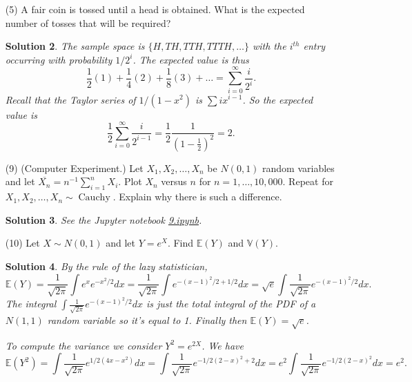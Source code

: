 \documentclass[10pt]{article}
\newtheorem*{sol}{Solution}
\newcommand{\V}{\mathbb{V}}
\newcommand{\E}{\mathbb{E}}
\begin{document}
\begin{enumerate}
\begin{sol}
By independence, the variance is $\V(X_n) = \sum_{i=0}^n \V(1-2Y_i)$.
We have $(1-2Y_i)^2=1$ always so $\E(((1-2Y_i)^2)=1$. So
\[
\V(1-2Y_i) = \E((1-2Y_i)^2) - \E(1-2Y_i)^2 = 1 - (1-2p)^2 = 4p-4p^2
\text{ and } \V(X_n) = 4np(1-p).
\]
\end{sol}

\item[(5)]
A fair coin is tossed until a head is obtained. What is the expected
number of tosses that will be required?

\begin{sol}
The sample space is $\{H, TH, TTH, TTTH,\ldots\}$ with the $i^{th}$ entry
occurring with probability $1/2^i$. The expected value is thus
\[
\frac{1}{2}(1) + \frac{1}{4}(2) + \frac{1}{8}(3) + \ldots =
\sum_{i=0}^\infty \frac{i}{2^i}.
\]
Recall that the Taylor series of $1/(1-x^2)$ is $\sum i x^{i-1}$. So
the expected value is
\[
\frac{1}{2}\sum_{i=0}^\infty \frac{i}{2^{i-1}} =
\frac{1}{2} \frac{1}{(1-\frac{1}{2})^2} = 2.
\]
\end{sol}

\item[(9)]
(Computer Experiment.) Let $X_1, X_2, \ldots, X_n$ be $N(0, 1)$ random variables
and let $\overline{X_n} = n^{-1} \sum_{i=1}^n X_i$.
Plot $X_n$ versus $n$ for $n = 1, \ldots, 10,000$.
Repeat for $X_1,X_2,\ldots,X_n \sim \operatorname{Cauchy}$.
Explain why there is such a difference.

\begin{sol}
See the Jupyter notebook
\href{https://github.com/ajrasmus/some_of_statistics/blob/main/chapter_3/9.ipynb}{9.ipynb}.
\end{sol}

\item[(10)]
Let $X \sim N(0,1)$ and let $Y = e^X$. Find $\E(Y)$ and $\V(Y)$.

\begin{sol}
By the rule of the lazy statistician,
\[
\E(Y) = \frac{1}{\sqrt{2\pi}} \int e^x e^{-x^2/2}dx
= \frac{1}{\sqrt{2\pi}} \int e^{-(x-1)^2/2 + 1/2}dx
= \sqrt{e} \int \frac{1}{\sqrt{2\pi}} e^{-(x-1)^2/2}dx.
\]
The integral $\int \frac{1}{\sqrt{2\pi}} e^{-(x-1)^2/2}dx$ is just the total
integral of the PDF of a $N(1,1)$ random variable so it's equal to 1. Finally
then $\E(Y)=\sqrt{e}$.

To compute the variance we consider $Y^2 = e^{2X}$. We have
\[
\E(Y^2) = \int \frac{1}{\sqrt{2\pi}} e^{1/2(4x-x^2)}dx =
\int \frac{1}{\sqrt{2\pi}} e^{-1/2(2-x)^2+2}dx =
e^2 \int \frac{1}{\sqrt{2\pi}} e^{-1/2(2-x)^2}dx = e^2.
\]


\end{sol}
\end{enumerate}
\end{document}
